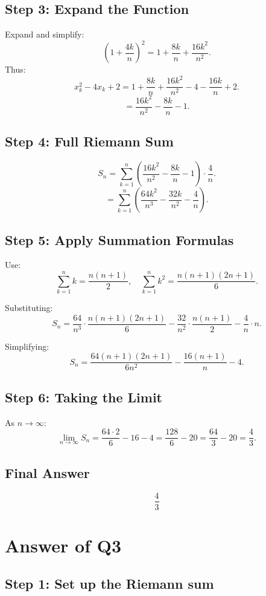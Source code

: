 \documentclass{article}
\begin{document}
\subsection*{Step 3: Expand the Function}
Expand and simplify:
\[
\left(1 + \frac{4k}{n}\right)^2 = 1 + \frac{8k}{n} + \frac{16k^2}{n^2}.
\]
Thus:
\[
x_k^2 - 4x_k + 2 = 1 + \frac{8k}{n} + \frac{16k^2}{n^2} - 4 - \frac{16k}{n} + 2.
\]
\[
= \frac{16k^2}{n^2} - \frac{8k}{n} - 1.
\]

\subsection*{Step 4: Full Riemann Sum}
\[
S_n = \sum_{k=1}^{n} \left( \frac{16k^2}{n^2} - \frac{8k}{n} - 1 \right) \cdot \frac{4}{n}.
\]
\[
= \sum_{k=1}^{n} \left( \frac{64k^2}{n^3} - \frac{32k}{n^2} - \frac{4}{n} \right).
\]

\subsection*{Step 5: Apply Summation Formulas}
Use:
\[
\sum_{k=1}^{n} k = \frac{n(n+1)}{2}, \quad \sum_{k=1}^{n} k^2 = \frac{n(n+1)(2n+1)}{6}.
\]

Substituting:
\[
S_n = \frac{64}{n^3} \cdot \frac{n(n+1)(2n+1)}{6} - \frac{32}{n^2} \cdot \frac{n(n+1)}{2} - \frac{4}{n} \cdot n.
\]

Simplifying:
\[
S_n = \frac{64(n+1)(2n+1)}{6n^2} - \frac{16(n+1)}{n} - 4.
\]

\subsection*{Step 6: Taking the Limit}
As $n \to \infty$:
\[
\lim_{n \to \infty} S_n = \frac{64 \cdot 2}{6} - 16 - 4 = \frac{128}{6} - 20 = \frac{64}{3} - 20 = \frac{4}{3}.
\]

\subsection*{Final Answer}
\[
\boxed{\frac{4}{3}}
\]
\section*{Answer of Q3}

\subsection*{Step 1: Set up the Riemann sum}
\end{document}
